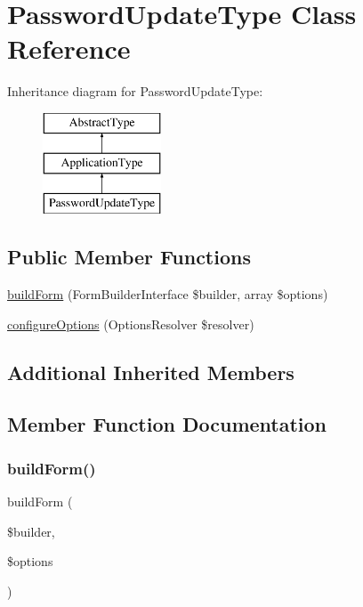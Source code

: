 \hypertarget{class_app_1_1_form_1_1_password_update_type}{}\section{Password\+Update\+Type Class Reference}
\label{class_app_1_1_form_1_1_password_update_type}
Inheritance diagram for Password\+Update\+Type\+:\begin{figure}[H]
\begin{center}
\leavevmode
\includegraphics[height=3.000000cm]{class_app_1_1_form_1_1_password_update_type}
\end{center}
\end{figure}
\subsection*{Public Member Functions}
\begin{DoxyCompactItemize}
\item 
\mbox{\hyperlink{class_app_1_1_form_1_1_password_update_type_a83c3745710374f9c5a1eb0686fe2dfab}{build\+Form}} (Form\+Builder\+Interface \$builder, array \$options)
\item 
\mbox{\hyperlink{class_app_1_1_form_1_1_password_update_type_a8ff68a86f5090b5df973286836e46ead}{configure\+Options}} (Options\+Resolver \$resolver)
\end{DoxyCompactItemize}
\subsection*{Additional Inherited Members}


\subsection{Member Function Documentation}
\mbox{\label{class_app_1_1_form_1_1_password_update_type_a83c3745710374f9c5a1eb0686fe2dfab}} 
\subsubsection{\texorpdfstring{buildForm()}{buildForm()}}
{\footnotesize\ttfamily build\+Form (\begin{DoxyParamCaption}\item[{Form\+Builder\+Interface}]{\$builder,  }\item[{array}]{\$options }\end{DoxyParamCaption})}

